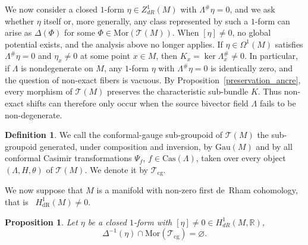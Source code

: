 \documentclass[11pt,a4paper]{article}
\theoremstyle{plain}
\newtheorem{proposition}[theorem]{Proposition}
\theoremstyle{definition}
\newtheorem{definition}[theorem]{Definition}
\theoremstyle{remark}
\begin{document}
We now consider a closed $1$-form $\eta \in Z^1_{dR}(M)$ with $\Lambda^{\#}\eta = 0$, and we ask whether $\eta$ itself or, more generally, any class
represented by such a $1$-form can arise as $\Delta(\Phi)$ for some $\Phi \in \mathrm{Mor}(\mathcal{T}(M))$. When $[\eta] \neq 0$, no global potential exists, and the analysis above no longer applies. If $\eta \in \Omega^1(M)$ satisfies $\Lambda^{\#}\eta = 0$ and $\eta_x \neq 0$ at some point $x \in M$, then
$K_x = \ker \Lambda^{\#}_x \neq 0$. In particular, if $\Lambda$ is nondegenerate on $M$,
any $1$-form $\eta$ with $\Lambda^{\#}\eta = 0$ is identically zero, and the question of
non-exact fibers is vacuous. By Proposition~\ref{preservation_ancre}, every morphism of $\mathcal{T}(M)$ preserves the
characteristic sub-bundle $K$. Thus non-exact shifts can therefore only occur when
the source bivector field $\Lambda$ fails to be non-degenerate.

\begin{definition}\label{def:Tcg}
	We call the conformal-gauge sub-groupoid of $\mathcal{T}(M)$ the sub-groupoid generated, under composition and inversion, by $\mathrm{Gau}(M)$
	and by all conformal Casimir transformations $\Psi_f$, $f \in \mathrm{Cas}(\Lambda)$, taken over
	every object $(\Lambda, H, \theta)$ of $\mathcal{T}(M)$. We denote it by $\mathcal{T}_{\mathrm{cg}}$.
\end{definition}
We  now suppose that $M$ is a manifold with non-zero first
de~Rham cohomology, that is \ $H_{\mathrm{dR}}^{1}(M)\neq 0$.
\begin{proposition}\label{prop:nogo}
	Let $\eta$ be a closed $1$-form with
	$[\eta] \neq 0 \in H^1_{dR}(M, \mathbb{R})$,
	$$
	\Delta^{-1}(\eta) \cap \mathrm{Mor}(\mathcal{T}_{\mathrm{cg}}) = \varnothing.
	$$
\end{proposition}
\end{document}

